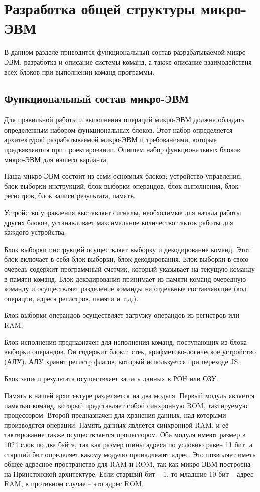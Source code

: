 \section{Разработка общей структуры микро-ЭВМ}
\label{sec:domain}

В данном разделе приводится функциональный состав разрабатываемой микро-ЭВМ, разработка и описание системы команд, а также описание взаимодействия всех блоков при выполнении команд программы.
\subsection{Функциональный состав микро-ЭВМ}
\label{sub:domain:bayes_net}
Для правильной работы и выполнения операций микро-ЭВМ должна обладать определенным набором функциональных блоков. Этот набор определяется архитектурой разрабатываемой микро-ЭВМ и требованиями, которые предъявляются при проектировании. Опишем набор функциональных блоков микро-ЭВМ для нашего варианта.

Наша микро-ЭВМ состоит из семи основных блоков: устройство управления, блок выборки инструкций, блок выборки операндов, блок выполнения, блок регистров, блок записи результата, память.

Устройство управления выставляет сигналы, необходимые для начала работы других блоков, устанавливает максимальное количество тактов работы для каждого устройства.

Блок выборки инструкций осуществляет выборку и декодирование команд. Этот блок включает в себя блок выборки, блок декодирования. Блок выборки в свою очередь содержит программный счетчик, который указывает на текущую команду в памяти команд. Блок декодирования принимает из памяти команд очередную команду и осуществляет разделение команды на отдельные составляющие (код операции, адреса регистров, памяти и т.д.).

Блок выборки операндов осуществляет загрузку операндов из регистров или RAM.

Блок исполнения предназначен для исполнения команд, поступающих из блока выборки операндов.
Он содержит блоки: стек, арифметико-логическое устройство (АЛУ). АЛУ хранит регистр флагов, который используется при переходе JS.

Блок записи результата осуществляет запись данных в РОН или ОЗУ.

Память в нашей архитектуре разделяется на два модуля.
Первый модуль является памятью команд, который представляет собой синхронную ROM,
тактируемую процессором.
Второй предназначен для хранения данных, над которыми производятся операции.
Память данных является синхронной RAM, и её тактирование также осуществляется процессором.
Оба модуля имеют размер в 1024 слов по два байта, так как размер шины адреса по условию равен 11 бит, а старший бит определяет какому модулю принадлежит адрес. Это позволяет иметь общее адресное пространство для RAM и ROM, так как микро-ЭВМ построена на Принстонской архитектуре. Если старший бит -- 1, то младшие 10 бит -- адрес RAM, в противном случае -- это адрес ROM.

